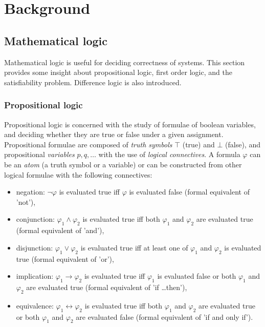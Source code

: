 \chapter{Background}
\label{chap:background}


\section{Mathematical logic}

Mathematical logic is useful for deciding correctness of systems. This section provides some insight about propositional logic, first order logic, and the satisfiability problem. Difference logic is also introduced.

\subsection{Propositional logic}

Propositional logic is concerned with the study of formulae of boolean variables, and deciding whether they are true or false under a given assignment. Propositional formulae are composed of \emph{truth symbols} $\top$ (true) and $\bot$ (false),  and propositional \emph{variables} $p,q, \dots$ with the use of \emph{logical connectives}. A formula $\varphi$ can be an \emph{atom} (a truth symbol or a variable) or can be constructed from other logical formulae with the following connectives:

\begin{itemize}
	\item negation: $\neg\varphi$ is evaluated true iff $\varphi$ is evaluated false (formal equivalent of 'not'),
	\item conjunction: $\varphi_1 \wedge \varphi_2$ is evaluated true iff  both $\varphi_1$ and $\varphi_2$ are evaluated true (formal equivalent of 'and'),
	\item disjunction: $\varphi_1 \vee \varphi_2$ is evaluated true iff  at least one of $\varphi_1$ and $\varphi_2$ is evaluated true (formal equivalent of 'or'),
	\item implication: $\varphi_1 \to \varphi_2$ is evaluated true iff  $\varphi_1$ is evaluated false or both $\varphi_1$ and $\varphi_2$ are evaluated true (formal equivalent of 'if \ldots then'),
	\item equivalence: $\varphi_1 \leftrightarrow \varphi_2$ is evaluated true iff   both $\varphi_1$ and $\varphi_2$ are evaluated true or  both $\varphi_1$ and $\varphi_2$ are evaluated false (formal equivalent of 'if and only if').
\end{itemize}

